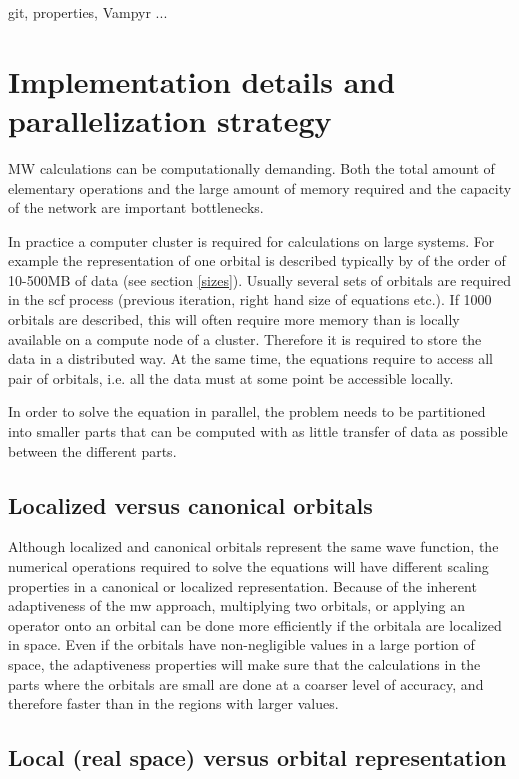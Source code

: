 \documentclass{article}
\begin{document}
git, properties, Vampyr ...


\section{Implementation details and parallelization strategy}

MW calculations can be computationally demanding. Both the total amount of elementary operations and the large amount of memory required and the capacity of the network are important bottlenecks. 

In practice a computer cluster is required for calculations on large systems.
For example the representation of one orbital is described typically by of the order of 10-500MB of data (see section \ref{sizes}). Usually several sets of orbitals are required in the scf process (previous iteration, right hand size of equations etc.). If 1000 orbitals are described, this will often require more memory than is locally available on a compute node of a cluster. Therefore it is required to store the data in a distributed way. At the same time, the equations require to access all pair of orbitals, i.e. all the data must at some point be accessible locally.

In order to solve the equation in parallel, the problem needs to be partitioned into smaller parts that can be computed with as little transfer of data as possible between the different parts.



\subsection{Localized versus canonical orbitals}

Although localized and canonical orbitals represent the same wave function, the numerical operations required to solve the equations will have different scaling properties in a canonical or localized representation.
Because of the inherent adaptiveness of the mw approach, multiplying two orbitals, or applying an operator onto an orbital can be done more efficiently if the orbitala are localized in space. Even if the orbitals have non-negligible values in a large portion of space, the adaptiveness properties will make sure that the calculations in the parts where the orbitals are small are done at a coarser level of accuracy, and therefore faster than in the regions with larger values.

\subsection{Local (real space) versus orbital representation}
\end{document}
